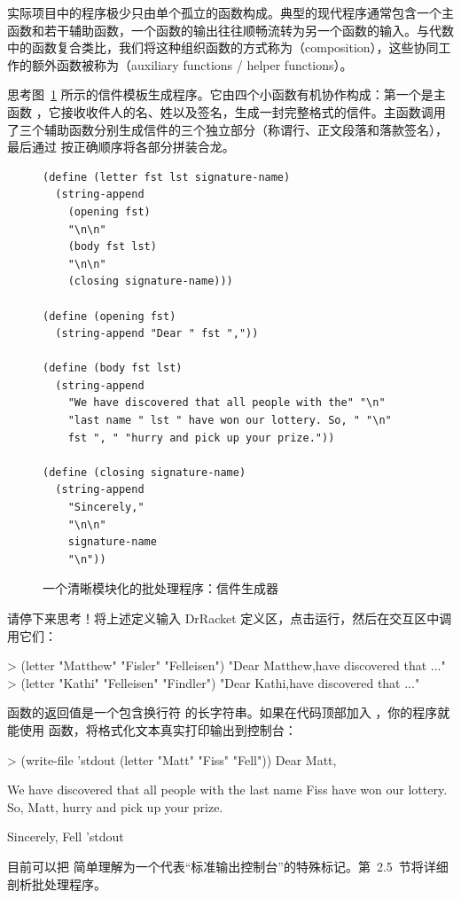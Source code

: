 实际项目中的程序极少只由单个孤立的函数构成。典型的现代程序通常包含一个主函数和若干辅助函数，一个函数的输出往往顺畅流转为另一个函数的输入。与代数中的函数复合类比，我们将这种组织函数的方式称为（composition），这些协同工作的额外函数被称为（auxiliary functions / helper functions）。

思考图~\ref{fig:ch02_batch_letter} 所示的信件模板生成程序。它由四个小函数有机协作构成：第一个是主函数 ，它接收收件人的名、姓以及签名，生成一封完整格式的信件。主函数调用了三个辅助函数分别生成信件的三个独立部分（称谓行、正文段落和落款签名），最后通过  按正确顺序将各部分拼装合龙。

\begin{figure}[htbp]
  \centering
\begin{lstlisting}[language=BSL, basicstyle=\scriptsize\ttfamily]
(define (letter fst lst signature-name)
  (string-append
    (opening fst)
    "\n\n"
    (body fst lst)
    "\n\n"
    (closing signature-name)))

(define (opening fst)
  (string-append "Dear " fst ","))

(define (body fst lst)
  (string-append
    "We have discovered that all people with the" "\n"
    "last name " lst " have won our lottery. So, " "\n"
    fst ", " "hurry and pick up your prize."))

(define (closing signature-name)
  (string-append
    "Sincerely,"
    "\n\n"
    signature-name
    "\n"))
\end{lstlisting}
  \caption{一个清晰模块化的批处理程序：信件生成器}
  \label{fig:ch02_batch_letter}
\end{figure}

请停下来思考！将上述定义输入 DrRacket 定义区，点击运行，然后在交互区中调用它们：
\begin{replbox}
> (letter "Matthew" "Fisler" "Felleisen")
"Dear Matthew,\n\nWe have discovered that ...\n"
> (letter "Kathi" "Felleisen" "Findler")
"Dear Kathi,\n\nWe have discovered that ...\n"
\end{replbox}

\begin{notebox}[控制台打印输出]
函数的返回值是一个包含换行符  的长字符串。如果在代码顶部加入 ，你的程序就能使用  函数，将格式化文本真实打印输出到控制台：
\begin{replbox}
> (write-file 'stdout (letter "Matt" "Fiss" "Fell"))
Dear Matt,

We have discovered that all people with the
last name Fiss have won our lottery. So,
Matt, hurry and pick up your prize.

Sincerely,
Fell
'stdout
\end{replbox}
目前可以把  简单理解为一个代表“标准输出控制台”的特殊标记。第~2.5~节将详细剖析批处理程序。
\end{notebox}

